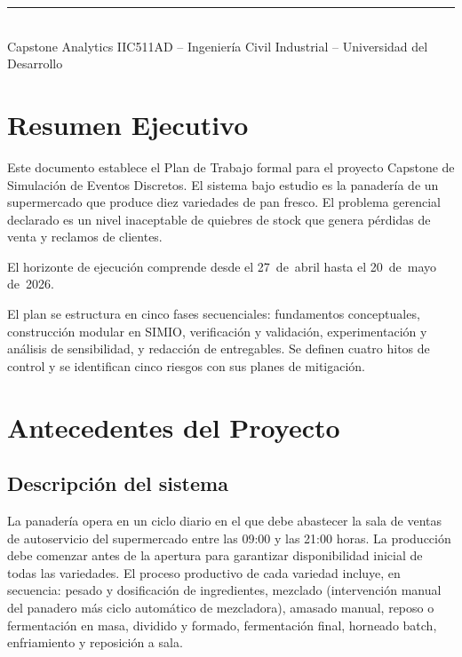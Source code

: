 \documentclass[12pt]{article}
\begin{document}
\begin{titlepage}
\vfill
{\color{azulppal}\rule{\linewidth}{2.5pt}}\\[0.3em]
{\small\color{grisoscuro} Capstone Analytics IIC511AD -- Ingeniería Civil Industrial -- Universidad del Desarrollo}
\end{titlepage}

\tableofcontents
\newpage

\section{Resumen Ejecutivo}

Este documento establece el Plan de Trabajo formal para el proyecto Capstone de Simulación de Eventos Discretos. El sistema bajo estudio es la panadería de un supermercado que produce diez variedades de pan fresco. El problema gerencial declarado es un nivel inaceptable de quiebres de stock que genera pérdidas de venta y reclamos de clientes.

El horizonte de ejecución comprende desde el 27~de~abril hasta el 20~de~mayo de~2026.

El plan se estructura en cinco fases secuenciales: fundamentos conceptuales, construcción modular en SIMIO, verificación y validación, experimentación y análisis de sensibilidad, y redacción de entregables. Se definen cuatro hitos de control y se identifican cinco riesgos con sus planes de mitigación.
\newpage

\section{Antecedentes del Proyecto}

\subsection{Descripción del sistema}

La panadería opera en un ciclo diario en el que debe abastecer la sala de ventas de autoservicio del supermercado entre las 09:00 y las 21:00 horas. La producción debe comenzar antes de la apertura para garantizar disponibilidad inicial de todas las variedades. El proceso productivo de cada variedad incluye, en secuencia: pesado y dosificación de ingredientes, mezclado (intervención manual del panadero más ciclo automático de mezcladora), amasado manual, reposo o fermentación en masa, dividido y formado, fermentación final, horneado batch, enfriamiento y reposición a sala.
\end{document}
